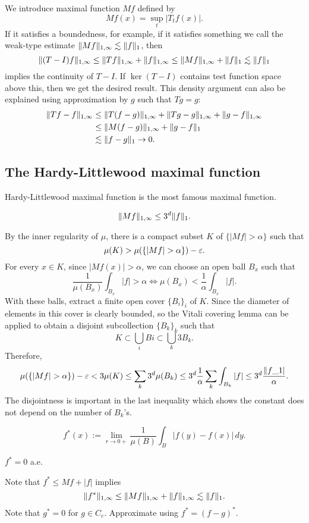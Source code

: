 \documentclass{../crs}
\begin{document}
We introduce maximal function $Mf$ defined by
\[Mf(x)=\sup_t|T_tf(x)|.\]
If it satisfies a boundedness, for example, if it satisfies something we call the weak-type estimate $\|Mf\|_{1,\infty}\lesssim\|f\|_1$, then
\[\|(T-I)f\|_{1,\infty}\le\|Tf\|_{1,\infty}+\|f\|_{1,\infty}\le\|Mf\|_{1,\infty}+\|f\|_1\lesssim\|f\|_1\]
implies the continuity of $T-I$.
If $\ker(T-I)$ contains test function space above this, then we get the desired result.
This density argument can also be explained using approximation by $g$ such that $Tg=g$:
\begin{align*}
\|Tf-f\|_{1,\oo}&\le \|T(f-g)\|_{1,\oo}+\|Tg-g\|_{1,\oo}+\|g-f\|_{1,\oo}\\&\le \|M(f-g)\|_{1,\oo}+\|g-f\|_1\\&\lesssim \|f-g\|_1\to0.
\end{align*}



\subsection{The Hardy-Littlewood maximal function}
Hardy-Littlewood maximal function is the most famous maximal function.

\begin{thm}
\[\|Mf\|_{1,\infty}\le 3^d\|f\|_1.\]
\end{thm}
\begin{pf}
By the inner regularity of $\mu$, there is a compact subset $K$ of $\{|Mf|>\alpha\}$ such that
\[\mu(K)>\mu(\{|Mf|>\alpha\})-\e.\]
For every $x\in K$, since $|Mf(x)|>\alpha$, we can choose an open ball $B_x$ such that
\[\frac1{\mu(B_x)}\int_{B_x}|f|>\alpha\iff\mu(B_x)<\frac1\alpha\int_{B_x}|f|.\]
With these balls, extract a finite open cover $\{B_i\}_i$ of $K$.
Since the diameter of elements in this cover is clearly bounded, so the Vitali covering lemma can be applied to obtain a disjoint subcollection $\{B_k\}_k$ such that
\[K\subset\bigcup_iBi\subset\bigcup_k3B_k.\]
Therefore,
\[\mu(\{|Mf|>\alpha\})-\e<3\mu(K)\le\sum_k3^d\mu(B_k)\le3^d\frac1\alpha\sum_k\int_{B_k}|f|\le3^d\frac{\|f\_1|}\alpha.\]
The disjointness is important in the last inequality which shows the constant does not depend on the number of $B_k$'s.
\end{pf}

\begin{defn}
\[f^*(x):=\lim_{r\to0+}\frac1{\mu(B)}\int_B|f(y)-f(x)|\,dy.\]
\end{defn}
\begin{thm}
$f^*=0$ a.e.
\end{thm}
\begin{pf}
Note that $f^*\le Mf+|f|$ implies
\[\|f^*\|_{1,\infty}\le\|Mf\|_{1,\infty}+\|f\|_{1,\infty}\lesssim\|f\|_1.\]
Note that $g^*=0$ for $g\in C_c$.
Approximate using $f^*=(f-g)^*$.
\end{pf}
\end{document}
